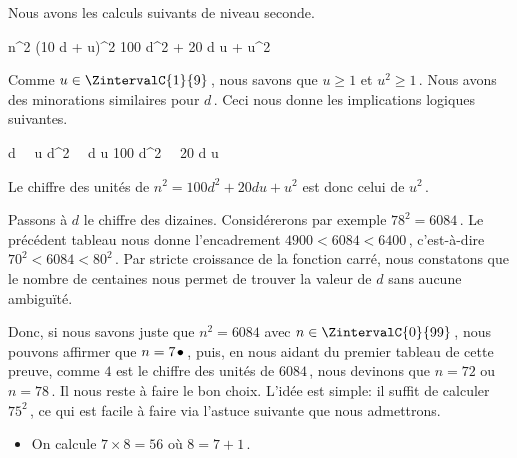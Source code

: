 \begin{method}
    
    Nous avons les calculs suivants de niveau seconde.
    
    \medskip
    
    \begin{stepcalc}[style = sar]
    	n^2
	\explnext{}
    	(10 d + u)^2
    	100 d^2 + 20 d u + u^2
    \end{stepcalc}
    
    \medskip
    
    Comme $u \in \ZintervalC{1}{9}$\,, nous savons que 
    $u   \geq 1$ et
    $u^2 \geq 1$\,.
    Nous avons des minorations similaires pour $d$\,.
    Ceci nous donne les implications logiques suivantes.
    
    \medskip

    \begin{stepcalc}[style = ar*, ope = {\implies[donc]}]
    	d \in {}
		\,\,\,\,
    	u \in {}
	\explnext{}
    	d^2 
		\,\,\,\,
    	d u 
	\explnext{}
    	100 d^2 
		\,\,\,\,
    	20 d u 
    \end{stepcalc}
    
    \bigskip

    Le chiffre des unités de $n^2 = 100 d^2 + 20 d u + u^2$ est donc celui de $u^2$\,.
    
    \medskip

    Passons à $d$ le chiffre des dizaines. 
    Considérerons par exemple $78^2 = 6084$\,. Le précédent tableau nous donne l'encadrement $4900< 6084 < 6400$\,, c'est-à-dire $70^2 < 6084 < 80^2$\,.
    Par stricte croissance de la fonction carré, nous constatons que le nombre de centaines nous permet de trouver la valeur de $d$ sans aucune ambiguïté.
    
    \medskip

    Donc, si nous savons juste que $n^2 = 6084$ avec $n \in \ZintervalC{0}{99}$\,, nous pouvons affirmer que $n = 7\kern1pt\bullet$\,, puis, en nous aidant du premier tableau de cette preuve, comme $4$ est le chiffre des unités de $6084$\,, nous devinons que $n = 72$ ou $n = 78$\,. Il nous reste à faire le bon choix. L'idée est simple: il suffit de calculer $75^2$\,, ce qui est facile à faire via l'astuce suivante que nous admettrons.
    
    \begin{itemize}
    	\item On calcule $7 \times 8 = 56$ où $8 = 7 + 1$\,.
	

\end{itemize}
\end{method}

